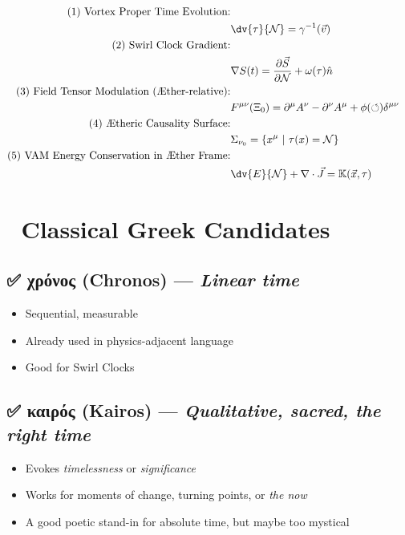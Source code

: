 \documentclass[12pt]{article}
\begin{document}
    \begin{align}
        \text{(1) Vortex Proper Time Evolution:}\\
        \quad & \dv{\tau}{\mathcal{N}} = \gamma^{-1}(\vec{v}) \\
        \text{(2) Swirl Clock Gradient:}\\ \quad & \nabla S(t) = \frac{\partial \vec{S}}{\partial \mathcal{N}} + \omega(\tau) \hat{n} \\
        \text{(3) Field Tensor Modulation (Æther-relative):} \\\quad & F^{\mu\nu}(\Xi_0) = \partial^\mu A^\nu - \partial^\nu A^\mu + \phi(\circlearrowleft) \delta^{\mu\nu} \\
        \text{(4) Ætheric Causality Surface:}\\ \quad & \Sigma_{\nu_0} = \{ x^\mu \ | \ \tau(x) = \mathcal{N} \} \\
        \text{(5) VAM Energy Conservation in Æther Frame:}\\ \quad & \dv{E}{\mathcal{N}} + \nabla \cdot \vec{J} = \mathbb{K}(\vec{x}, \tau)
    \end{align}


\section*{🔀 Classical Greek Candidates}
\subsection*{✅ χρόνος (Chronos) — \textit{Linear time}}
\begin{itemize}
\item Sequential, measurable
\item Already used in physics-adjacent language
\item Good for Swirl Clocks
\end{itemize}

\subsection*{✅ καιρός (Kairos) — \textit{Qualitative, sacred, the right time}}
\begin{itemize}
\item Evokes \textit{timelessness} or \textit{significance}
\item Works for moments of change, turning points, or \textit{the now}
\item A good poetic stand-in for absolute time, but maybe too mystical
\end{itemize}
\end{document}
